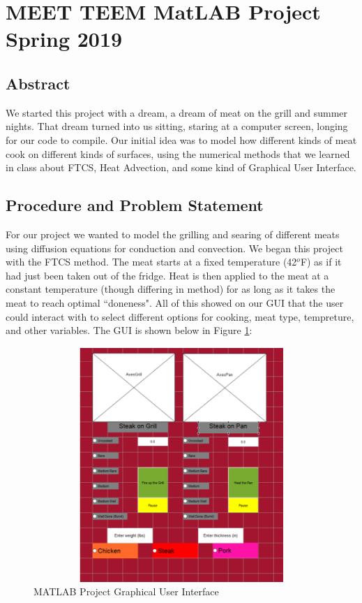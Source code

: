 \documentclass[12pt]{article}
\begin{document}
		

\section*{MEET TEEM MatLAB Project \hfill  Spring 2019}
\author*{Alex Gonzalez, Ben Harker, and Kyle Wahlberg}
\vspace{.3in}	

\subsection*{Abstract}
We started this project with a dream, a dream of meat on the grill and summer nights. That dream turned into us sitting, staring at a computer screen, longing for our code to compile. Our initial idea was to model how different kinds of meat cook on different kinds of surfaces, using the numerical methods that we learned in class about FTCS, Heat Advection, and some kind of Graphical User Interface.


\subsection*{Procedure and Problem Statement}
For our project we wanted to model the grilling and searing of different meats using diffusion equations for conduction and convection. We began this project with the FTCS method. The meat starts at a fixed temperature (42$^o$F) as if it had just been taken out of the fridge. Heat is then applied to the meat at a constant temperature (though differing in method) for as long as it takes the meat to reach optimal ``doneness". All of this showed on our GUI that the user could interact with to select different options for cooking, meat type, tempreture, and other variables. The GUI is shown below in Figure \ref{GUI}:

\begin{figure}[htb] %
\label{GUI}
\begin{center}
\includegraphics[keepaspectratio=true, width=6.5in, height=3.5in]{gui.png}
\caption{MATLAB Project Graphical User Interface}
\end{center}
\end{figure}
\end{document}
